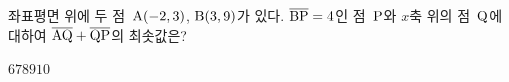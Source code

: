 좌표평면 위에 두 점~$\mathrm{A}(-2{,}\mkern3mu 3)$, $\mathrm{B}(3{,}\mkern3mu 9)$가 있다. $\overline{\mathrm{BP}}=4$인 점~$\mathrm{P}$와 $x$축 위의 점~$\mathrm{Q}$에 대하여 $\overline{\mathrm{AQ}}+\overline{\mathrm{QP}}$의 최솟값은?
\begin{choices32}{$6$}{$7$}{$8$}{$9$}{$10$}\end{choices32}
